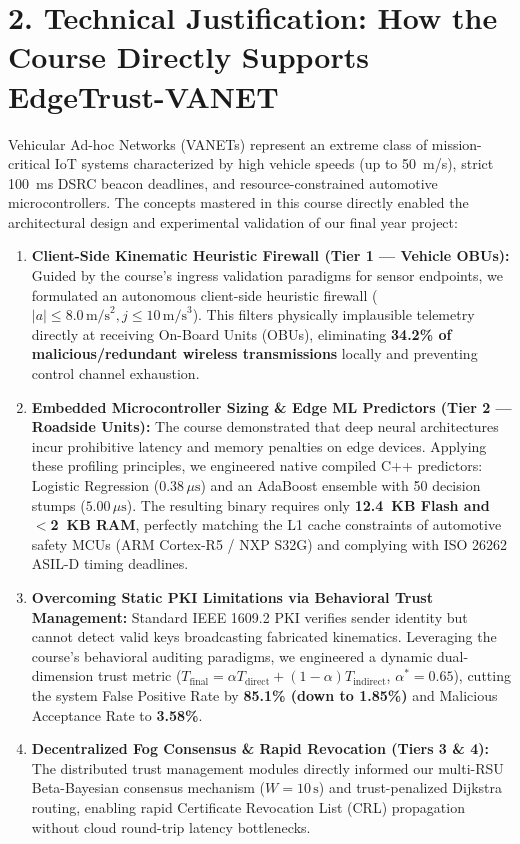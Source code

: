 \documentclass[10pt,a4paper]{article}
\begin{document}
\section*{2. Technical Justification: How the Course Directly Supports EdgeTrust-VANET}
Vehicular Ad-hoc Networks (VANETs) represent an extreme class of mission-critical IoT systems characterized by high vehicle speeds (up to 50~m/s), strict 100~ms DSRC beacon deadlines, and resource-constrained automotive microcontrollers. The concepts mastered in this course directly enabled the architectural design and experimental validation of our final year project:

\begin{enumerate}
    \item \textbf{Client-Side Kinematic Heuristic Firewall (Tier 1 --- Vehicle OBUs):} 
    Guided by the course's ingress validation paradigms for sensor endpoints, we formulated an autonomous client-side heuristic firewall ($|a| \le 8.0\,\text{m/s}^2, j \le 10\,\text{m/s}^3$). This filters physically implausible telemetry directly at receiving On-Board Units (OBUs), eliminating \textbf{34.2\% of malicious/redundant wireless transmissions} locally and preventing control channel exhaustion.

    \item \textbf{Embedded Microcontroller Sizing \& Edge ML Predictors (Tier 2 --- Roadside Units):} 
    The course demonstrated that deep neural architectures incur prohibitive latency and memory penalties on edge devices. Applying these profiling principles, we engineered native compiled C++ predictors: Logistic Regression ($0.38\,\mu\text{s}$) and an AdaBoost ensemble with 50 decision stumps ($5.00\,\mu\text{s}$). The resulting binary requires only \textbf{12.4~KB Flash and $<$2~KB RAM}, perfectly matching the L1 cache constraints of automotive safety MCUs (ARM Cortex-R5 / NXP S32G) and complying with ISO 26262 ASIL-D timing deadlines.

    \item \textbf{Overcoming Static PKI Limitations via Behavioral Trust Management:} 
    Standard IEEE 1609.2 PKI verifies sender identity but cannot detect valid keys broadcasting fabricated kinematics. Leveraging the course's behavioral auditing paradigms, we engineered a dynamic dual-dimension trust metric ($T_{\text{final}} = \alpha T_{\text{direct}} + (1-\alpha) T_{\text{indirect}}$, $\alpha^* = 0.65$), cutting the system False Positive Rate by \textbf{85.1\% (down to 1.85\%)} and Malicious Acceptance Rate to \textbf{3.58\%}.

    \item \textbf{Decentralized Fog Consensus \& Rapid Revocation (Tiers 3 \& 4):} 
    The distributed trust management modules directly informed our multi-RSU Beta-Bayesian consensus mechanism ($W = 10\,\text{s}$) and trust-penalized Dijkstra routing, enabling rapid Certificate Revocation List (CRL) propagation without cloud round-trip latency bottlenecks.
\end{enumerate}
\end{document}
